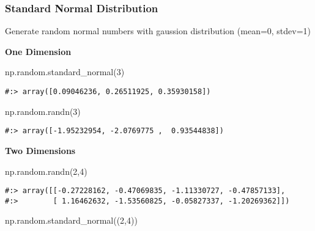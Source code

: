 \documentclass[
]{book}
\newenvironment{Shaded}{\begin{snugshade}}{\end{snugshade}}
\newcommand{\DecValTok}[1]{\textcolor[rgb]{0.06,0.06,0.06}{#1}}
\newcommand{\NormalTok}[1]{#1}
\begin{document}
\hypertarget{standard-normal-distribution}{%
\subsubsection{Standard Normal Distribution}\label{standard-normal-distribution}}

Generate random normal numbers with gaussion distribution (mean=0, stdev=1)

\textbf{One Dimension}

\begin{Shaded}
\begin{Highlighting}[]
\NormalTok{np.random.standard\_normal(}\DecValTok{3}\NormalTok{)}
\end{Highlighting}
\end{Shaded}

\begin{verbatim}
#:> array([0.09046236, 0.26511925, 0.35930158])
\end{verbatim}

\begin{Shaded}
\begin{Highlighting}[]
\NormalTok{np.random.randn(}\DecValTok{3}\NormalTok{)}
\end{Highlighting}
\end{Shaded}

\begin{verbatim}
#:> array([-1.95232954, -2.0769775 ,  0.93544838])
\end{verbatim}

\textbf{Two Dimensions}

\begin{Shaded}
\begin{Highlighting}[]
\NormalTok{np.random.randn(}\DecValTok{2}\NormalTok{,}\DecValTok{4}\NormalTok{)}
\end{Highlighting}
\end{Shaded}

\begin{verbatim}
#:> array([[-0.27228162, -0.47069835, -1.11330727, -0.47857133],
#:>        [ 1.16462632, -1.53560825, -0.05827337, -1.20269362]])
\end{verbatim}

\begin{Shaded}
\begin{Highlighting}[]
\NormalTok{np.random.standard\_normal((}\DecValTok{2}\NormalTok{,}\DecValTok{4}\NormalTok{))}
\end{Highlighting}
\end{Shaded}
\end{document}
